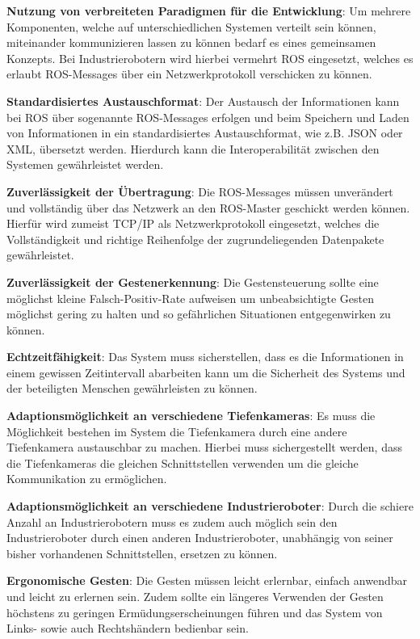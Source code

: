\begin{compactitem}
    \item \textbf{Nutzung von verbreiteten Paradigmen für die Entwicklung}: Um mehrere Komponenten, welche auf unterschiedlichen Systemen verteilt sein können, miteinander kommunizieren lassen zu können bedarf es eines gemeinsamen Konzepts. Bei Industrierobotern wird hierbei vermehrt ROS eingesetzt, welches es erlaubt ROS-Messages über ein Netzwerkprotokoll verschicken zu können.
    \item \textbf{Standardisiertes Austauschformat}: Der Austausch der Informationen kann bei ROS über sogenannte ROS-Messages erfolgen und beim Speichern und Laden von Informationen in ein standardisiertes Austauschformat, wie z.B. JSON oder XML, übersetzt werden. Hierdurch kann die Interoperabilität zwischen den Systemen gewährleistet werden.
    \item \textbf{Zuverlässigkeit der Übertragung}: Die ROS-Messages müssen unverändert und vollständig über das Netzwerk an den ROS-Master geschickt werden können. Hierfür wird zumeist TCP/IP als Netzwerkprotokoll eingesetzt, welches die Vollständigkeit und richtige Reihenfolge der zugrundeliegenden Datenpakete gewährleistet.
    \item \textbf{Zuverlässigkeit der Gestenerkennung}: Die Gestensteuerung sollte eine möglichst kleine Falsch-Positiv-Rate aufweisen um unbeabsichtigte Gesten möglichst gering zu halten und so gefährlichen Situationen entgegenwirken zu können.
    \item \textbf{Echtzeitfähigkeit}: Das System muss sicherstellen, dass es die Informationen in einem gewissen Zeitintervall abarbeiten kann um die Sicherheit des Systems und der beteiligten Menschen gewährleisten zu können.
    \item \textbf{Adaptionsmöglichkeit an verschiedene Tiefenkameras}: Es muss die Möglichkeit bestehen im System die Tiefenkamera durch eine andere Tiefenkamera austauschbar zu machen. Hierbei muss sichergestellt werden, dass die Tiefenkameras die gleichen Schnittstellen verwenden um die gleiche Kommunikation zu ermöglichen.
    \item \textbf{Adaptionsmöglichkeit an verschiedene Industrieroboter}: Durch die schiere Anzahl an Industrierobotern muss es zudem auch möglich sein den Industrieroboter durch einen anderen Industrieroboter, unabhängig von seiner bisher vorhandenen Schnittstellen, ersetzen zu können.
    \item \textbf{Ergonomische Gesten}: Die Gesten müssen leicht erlernbar, einfach anwendbar und leicht zu erlernen sein. Zudem sollte ein längeres Verwenden der Gesten höchstens zu geringen Ermüdungserscheinungen führen und das System von Links- sowie auch Rechtshändern bedienbar sein.

\end{compactitem}

